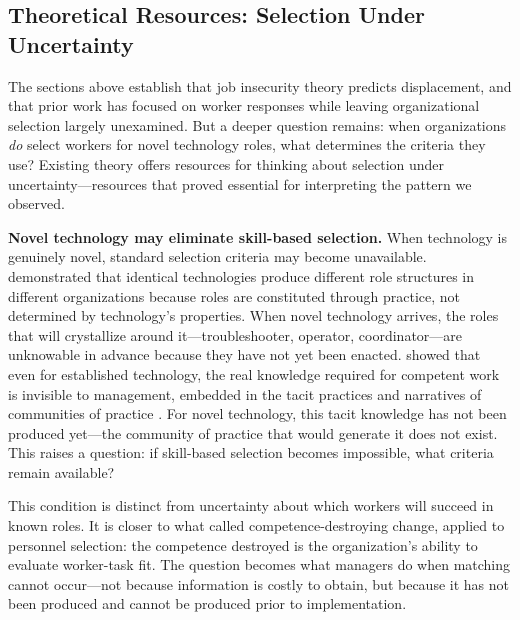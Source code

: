 \documentclass[12pt]{article}
\begin{document}
\subsection{Theoretical Resources: Selection Under Uncertainty}

The sections above establish that job insecurity theory predicts displacement, and that prior work has focused on worker responses while leaving organizational selection largely unexamined. But a deeper question remains: when organizations \textit{do} select workers for novel technology roles, what determines the criteria they use? Existing theory offers resources for thinking about selection under uncertainty---resources that proved essential for interpreting the pattern we observed.

\textbf{Novel technology may eliminate skill-based selection.} When technology is genuinely novel, standard selection criteria may become unavailable. \citet{barley1986technology} demonstrated that identical technologies produce different role structures in different organizations because roles are constituted through practice, not determined by technology's properties. When novel technology arrives, the roles that will crystallize around it---troubleshooter, operator, coordinator---are unknowable in advance because they have not yet been enacted. \citet{orr1996talking} showed that even for established technology, the real knowledge required for competent work is invisible to management, embedded in the tacit practices and narratives of communities of practice \citep{lave1991situated}. For novel technology, this tacit knowledge has not been produced yet---the community of practice that would generate it does not exist. This raises a question: if skill-based selection becomes impossible, what criteria remain available?

This condition is distinct from uncertainty about which workers will succeed in known roles. It is closer to what \citet{tushman1986technological} called competence-destroying change, applied to personnel selection: the competence destroyed is the organization's ability to evaluate worker-task fit. The question becomes what managers do when matching cannot occur---not because information is costly to obtain, but because it has not been produced and cannot be produced prior to implementation.
\end{document}

